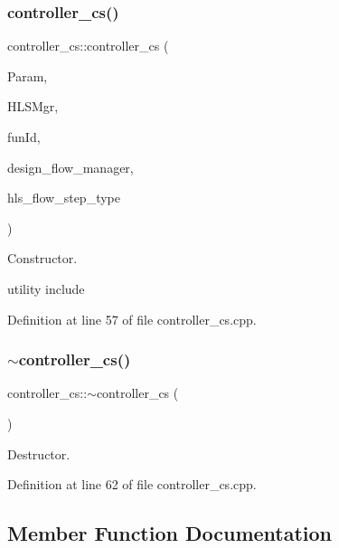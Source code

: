 \subsubsection{\texorpdfstring{controller\+\_\+cs()}{controller\_cs()}}
{\footnotesize\ttfamily controller\+\_\+cs\+::controller\+\_\+cs (\begin{DoxyParamCaption}\item[{const \hyperlink{Parameter_8hpp_a37841774a6fcb479b597fdf8955eb4ea}{Parameter\+Const\+Ref}}]{Param,  }\item[{const \hyperlink{hls__manager_8hpp_acd3842b8589fe52c08fc0b2fcc813bfe}{H\+L\+S\+\_\+manager\+Ref}}]{H\+L\+S\+Mgr,  }\item[{unsigned int}]{fun\+Id,  }\item[{const Design\+Flow\+Manager\+Const\+Ref}]{design\+\_\+flow\+\_\+manager,  }\item[{const \hyperlink{hls__step_8hpp_ada16bc22905016180e26fc7e39537f8d}{H\+L\+S\+Flow\+Step\+\_\+\+Type}}]{hls\+\_\+flow\+\_\+step\+\_\+type }\end{DoxyParamCaption})}



Constructor. 

utility include 

Definition at line 57 of file controller\+\_\+cs.\+cpp.

\mbox{\label{classcontroller__cs_af7eaf329397fc69c0541defaa04663fa}} 
\subsubsection{\texorpdfstring{$\sim$controller\+\_\+cs()}{~controller\_cs()}}
{\footnotesize\ttfamily controller\+\_\+cs\+::$\sim$controller\+\_\+cs (\begin{DoxyParamCaption}{ }\end{DoxyParamCaption})\hspace{0.3cm}{\ttfamily [virtual]}}



Destructor. 



Definition at line 62 of file controller\+\_\+cs.\+cpp.



\subsection{Member Function Documentation}
\mbox{\label{classcontroller__cs_a8e36030a52dc30ae10633fc28a45a2bb}} 
